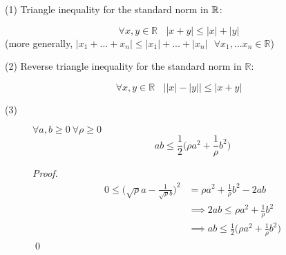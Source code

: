 \begin{description}
    \item[(1) Triangle inequality for the standard norm in $\mathbb{R}$:] 
\end{description}
$$\forall x,y \in \mathbb{R} ~~~~ |x+y| \leq |x| + |y|$$(more generally, $|x_1+...+x_n| \leq |x_1| + ... + |x_n| ~~~\forall x_1,...x_n \in \mathbb{R}$)

\begin{description}
    \item[(2) Reverse triangle inequality for the standard norm in $\mathbb{R}$: ] 
\end{description}
$$\forall x,y \in \mathbb{R} ~~~~\big| |x|-|y| \big| \leq |x+y|$$

\begin{description}
    \item[(3)] $\forall a,b \geq 0 ~ \forall \rho \geq 0$ $$ab \leq \frac{1}{2} \big(\rho a^2 + \frac{1}{\rho}b^2 \big)$$
    \begin{proof}
        \begin{align*} 0 \leq \big(\sqrt{\rho}a - \frac{1}{\sqrt{\rho}b} \big)^2 &= \rho a^2 + \frac{1}{\rho}b^2 - 2ab \\ &\implies2ab \leq \rho a^2 + \frac{1}{\rho}b^2 \\ &\implies ab \leq \frac{1}{2}\big(\rho a^2 + \frac{1}{\rho}b^2\big)\end{align*} \qed
    \end{proof}
\end{description}

